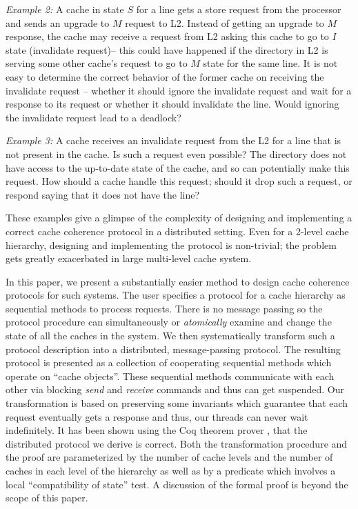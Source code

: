 \noindent \emph{Example 2:} A cache in state $S$ for a line gets a store
request from the processor and sends an upgrade to $M$ request to L2. Instead
of getting an upgrade to $M$ response, the cache may receive a request from L2
asking this cache to go to $I$ state (invalidate request)-- this could have
happened if the directory in L2 is serving some other cache's request to go to
$M$ state for the same line. It is not easy to determine the correct behavior
of the former cache on receiving the invalidate request -- whether it should
ignore the invalidate request and wait for a response to its request or whether
it should invalidate the line. Would ignoring the invalidate request lead to a
deadlock?

\noindent \emph{Example 3:} A cache receives an invalidate request from the
L2 for a line that is not present in the cache. Is such a request even
possible? The directory does not have access to the up-to-date state of the
cache, and so can potentially make this request. How should a cache handle this
request; should it drop such a request, or respond saying that it does not have
the line?

These examples give a glimpse of the complexity of designing and implementing a
correct cache coherence protocol in a distributed setting.  Even for a 2-level
cache hierarchy, designing and implementing the protocol is non-trivial; the
problem gets greatly exacerbated in large multi-level cache system. 

In this paper, we present a substantially easier method to design cache
coherence protocols for such systems. The user specifies a protocol for a cache
hierarchy as sequential methods to process requests. There is no message
passing so the protocol procedure can simultaneously or \emph{atomically}
examine and change the state of all the caches in the system. We then
systematically transform such a protocol description into a distributed,
message-passing protocol. The resulting protocol is presented as a collection
of cooperating sequential methods which operate on ``cache objects''.  These
sequential methods communicate with each other via blocking \emph{send} and
\emph{receive} commands and thus can get suspended. Our transformation is based
on preserving some invariants which guarantee that each request eventually gets
a response and thus, our threads can never wait indefinitely.  It has been
shown using the Coq theorem prover \cite{}, that the distributed protocol we
derive is correct.  Both the transformation procedure and the proof are
parameterized by the number of cache levels and the number of caches in each
level of the hierarchy as well as by a predicate which involves a local
``compatibility of state'' test. A discussion of the formal proof is beyond the
scope of this paper. 

